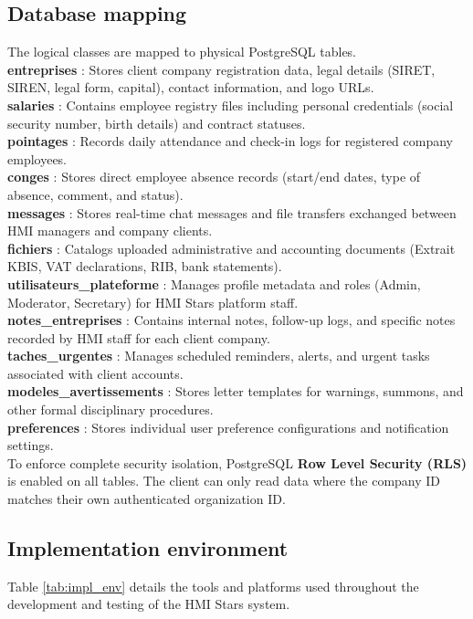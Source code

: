 \subsection{Database mapping}
The logical classes are mapped to physical PostgreSQL tables.\\
\textbf{entreprises} : Stores client company registration data, legal details (SIRET, SIREN, legal form, capital), contact information, and logo URLs.\\
\textbf{salaries} : Contains employee registry files including personal credentials (social security number, birth details) and contract statuses.\\
\textbf{pointages} : Records daily attendance and check-in logs for registered company employees.\\
\textbf{conges} : Stores direct employee absence records (start/end dates, type of absence, comment, and status).\\
\textbf{messages} : Stores real-time chat messages and file transfers exchanged between HMI managers and company clients.\\
\textbf{fichiers} : Catalogs uploaded administrative and accounting documents (Extrait KBIS, VAT declarations, RIB, bank statements).\\
\textbf{utilisateurs\_plateforme} : Manages profile metadata and roles (Admin, Moderator, Secretary) for HMI Stars platform staff.\\
\textbf{notes\_entreprises} : Contains internal notes, follow-up logs, and specific notes recorded by HMI staff for each client company.\\
\textbf{taches\_urgentes} : Manages scheduled reminders, alerts, and urgent tasks associated with client accounts.\\
\textbf{modeles\_avertissements} : Stores letter templates for warnings, summons, and other formal disciplinary procedures.\\
\textbf{preferences} : Stores individual user preference configurations and notification\\ settings.\\

To enforce complete security isolation, PostgreSQL \textbf{Row Level Security (RLS)}  is enabled on all tables. The client can only read data where the company ID matches their own authenticated organization ID.

\subsection{Implementation environment}
Table \ref{tab:impl_env} details the tools and platforms used throughout the development and testing of the HMI Stars system.

